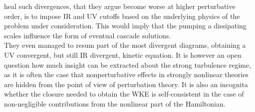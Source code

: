 heal such divergences, that they argue become worse at higher perturbative order, is to impose IR and UV cutoffs based on the underlying physics of the problem
under consideration. This would imply that the pumping a dissipating scales influence the form of eventual cascade solutions. \\
They even managed to resum part of the most divergent diagrams, obtaining a UV convergent, but still IR divergent, kinetic equation. It is however an open question 
how much insight can be extracted about the strong turbulence regime, as it is often the case that nonperturbative effects in strongly nonlinear theories are hidden
from the point of view of perturbation theory. It is also an incognita whether the closure needed to obtain the WKE is self-consistent in 
the case of non-negligible contributions 
from the nonlinear part of the Hamiltonian. \\

